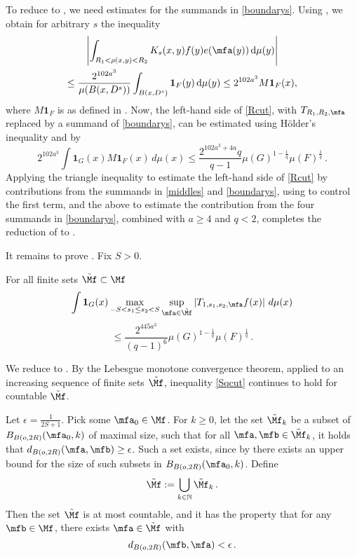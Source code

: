 To reduce  to , we need estimates for the summands in \eqref{boundarys}. Using , we obtain for arbitrary $s$ the inequality
\begin{multline}
\left|\int_{R_1 < \rho(x,y) < R_2} K_s(x,y) f(y) e(\mfa(y)) \, \mathrm{d}\mu(y)\right|\\
\leq \frac{2^{102 a^3}}{\mu(B(x, D^{s}))}
 \int_{B(x, D^s)} \mathbf{1}_F(y) \, \mathrm{d}\mu(y)
\leq 2^{102 a^3} M\mathbf{1}_F(x),
\end{multline}
where $M\mathbf{1}_F$ is as defined in .
Now, the left-hand side of \eqref{Rcut}, with $T_{R_1,R_2,\mfa}$ replaced by a summand of \eqref{boundarys}, can be estimated using H\"older's inequality and  by
$$
    2^{102 a^3}\int \mathbf{1}_{G}(x) M\mathbf{1}_F(x)\, d\mu(x)
    \leq \frac{2^{102 a^3+4a}q}{q-1}\mu(G)^{1-\frac{1}{q}} \mu(F)^{\frac{1}{q}}\,.
$$
Applying the triangle inequality to estimate the left-hand side of \eqref{Rcut} by contributions from the summands in \eqref{middles} and \eqref{boundarys}, using  to control the first term, and the above to estimate the contribution from the four summands in \eqref{boundarys}, combined with $a\geq 4$ and $q < 2$, completes the reduction of  to .

It remains to prove . Fix $S>0$.
\begin{lemma}
    \label{finitary-S-truncation}
    For all finite sets $\tilde{\Mf}\subset \Mf$
    $$
        \int \mathbf{1}_{G}(x)
        \max_{-S<s_1\le s_2<S}\sup_{\mfa\in\tilde{\Mf}}
        \left| T_{1, s_1,s_2,\mfa} f(x) \right|\, d\mu(x)
    $$
    \begin{equation} \label{Sqcut}
    \leq \frac{2^{445a^3}}{(q-1)^6} \mu(G)^{1-\frac{1}{q}} \mu(F)^{\frac{1}{q}}\,.
    \end{equation}
\end{lemma}

We reduce  to .
By the Lebesgue monotone convergence theorem,
applied to an increasing sequence of finite sets $\tilde{\Mf}$, inequality \eqref{Sqcut}
continues to hold for countable $\tilde{\Mf}$.

Let $\epsilon=\frac{1}{2S+1}$. Pick some $\mfa_0 \in \Mf$.
For $k \ge 0$, let the set $\tilde{\Mf}_k$ be a subset of $B_{B(o,2R)}(\mfa_0, k)$ of maximal size, such that for all $\mfa, \mfb \in \tilde{\Mf}_k$, it holds that $d_{B(o, 2R)}(\mfa, \mfb) \ge \epsilon$. Such a set exists, since by  there exists an upper bound for the size of such subsets in $B_{B(o, 2R)}(\mfa_0, k)$. Define
$$
    \tilde{\Mf} := \bigcup_{k \in \mathbb{N}} \tilde{\Mf}_k\,.
$$
Then the set $\tilde{\Mf}$ is at most countable, and it has the property that for any $\mfb \in \Mf$, there exists $\mfa \in \tilde{\Mf}$ with
$$
    d_{B(o, 2R)}(\mfb, \mfa) < \epsilon\,.
$$

